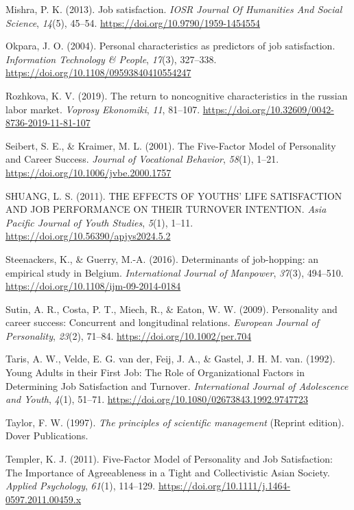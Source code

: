 \documentclass[
]{interact}
\newlength{\cslhangindent}
\newenvironment{CSLReferences}[2] %
 {\begin{list}{}{%
  \setlength{\itemindent}{0pt}
  \setlength{\leftmargin}{0pt}
  \setlength{\parsep}{0pt}
  \ifodd #1
   \setlength{\leftmargin}{\cslhangindent}
   \setlength{\itemindent}{-1\cslhangindent}
  \fi
  \setlength{\itemsep}{#2\baselineskip}}}
 {\end{list}}
\begin{document}
\begin{CSLReferences}{1}{0}
Mishra, P. K. (2013). Job satisfaction. \emph{IOSR Journal Of Humanities
And Social Science}, \emph{14}(5), 45--54.
\url{https://doi.org/10.9790/1959-1454554}

Okpara, J. O. (2004). Personal characteristics as predictors of job
satisfaction. \emph{Information Technology \& People}, \emph{17}(3),
327--338. \url{https://doi.org/10.1108/09593840410554247}

Rozhkova, K. V. (2019). The return to noncognitive characteristics in
the russian labor market. \emph{Voprosy Ekonomiki}, \emph{11}, 81--107.
\url{https://doi.org/10.32609/0042-8736-2019-11-81-107}

Seibert, S. E., \& Kraimer, M. L. (2001). The Five-Factor Model of
Personality and Career Success. \emph{Journal of Vocational Behavior},
\emph{58}(1), 1--21. \url{https://doi.org/10.1006/jvbe.2000.1757}

SHUANG, L. S. (2011). THE EFFECTS OF YOUTHS{'} LIFE SATISFACTION AND JOB
PERFORMANCE ON THEIR TURNOVER INTENTION. \emph{Asia Pacific Journal of
Youth Studies}, \emph{5}(1), 1--11.
\url{https://doi.org/10.56390/apjys2024.5.2}

Steenackers, K., \& Guerry, M.-A. (2016). Determinants of job-hopping:
an empirical study in Belgium. \emph{International Journal of Manpower},
\emph{37}(3), 494--510. \url{https://doi.org/10.1108/ijm-09-2014-0184}

Sutin, A. R., Costa, P. T., Miech, R., \& Eaton, W. W. (2009).
Personality and career success: Concurrent and longitudinal relations.
\emph{European Journal of Personality}, \emph{23}(2), 71--84.
\url{https://doi.org/10.1002/per.704}

Taris, A. W., Velde, E. G. van der, Feij, J. A., \& Gastel, J. H. M.
van. (1992). Young Adults in their First Job: The Role of Organizational
Factors in Determining Job Satisfaction and Turnover.
\emph{International Journal of Adolescence and Youth}, \emph{4}(1),
51--71. \url{https://doi.org/10.1080/02673843.1992.9747723}

Taylor, F. W. (1997). \emph{The principles of scientific management}
(Reprint edition). Dover Publications.

Templer, K. J. (2011). Five{-}Factor Model of Personality and Job
Satisfaction: The Importance of Agreeableness in a Tight and
Collectivistic Asian Society. \emph{Applied Psychology}, \emph{61}(1),
114--129. \url{https://doi.org/10.1111/j.1464-0597.2011.00459.x}


\end{CSLReferences}
\end{document}
